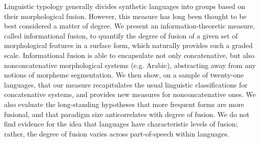Linguistic typology generally divides synthetic languages into groups based on their morphological fusion. However, this measure has long been thought to be best considered a matter of degree. We present an information-theoretic measure, called informational fusion, to quantify the degree of fusion of a given set of morphological features in a surface form, which naturally provides such a graded scale. Informational fusion is able to encapsulate not only concatenative, but also nonconcatenative morphological systems (e.g. Arabic), abstracting away from any notions of morpheme segmentation. We then show, on a sample of twenty-one languages, that our measure recapitulates the usual linguistic classifications for concatenative systems, and provides new measures for nonconcatenative ones. We also evaluate the long-standing hypotheses that more frequent forms are more fusional, and that paradigm size anticorrelates with degree of fusion. We do not find evidence for the idea that languages have characteristic levels of fusion; rather, the degree of fusion varies across part-of-speech within languages.
